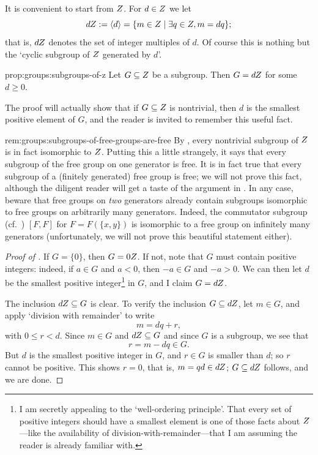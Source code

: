 It is convenient to start from $Z$. For $d \in Z$ we let
\[
  dZ := \langle d \rangle = \{m \in Z \mid \exists q \in Z, m =
  dq\};
\]
that is, $dZ$ denotes the set of integer multiples of $d$. Of course
this is nothing but the `cyclic subgroup of $Z$ generated by $d$'.

\begin{prop}{}{prop:groups:subgroups-of-z}
  Let $G \subseteq Z$ be a subgroup. Then $G = dZ$ for
    some $d \geq 0$.
\end{prop}
The proof will actually show that if $G \subseteq Z$ is nontrivial,
then $d$ is the smallest positive element of $G$, and the reader is
invited to remember this useful fact.

\begin{rem}{}{rem:groups:subgroups-of-free-groups-are-free}
  By , every nontrivial
  subgroup of $Z$ is in fact isomorphic to $Z$. Putting this a
  little strangely, it says that every subgroup of the free group on
  one generator is free. It is in fact true that every subgroup of a
  (finitely generated) free group is free; we will not prove this
  fact, although the diligent reader will get a taste of the argument
  in . In any
  case, beware that free groups on \emph{two} generators already
  contain subgroups isomorphic to free groups on arbitrarily many
  generators. Indeed, the commutator subgroup (cf.\
  ) $[F,F]$ for
  $F = F(\{x,y\})$ is isomorphic to a free group on infinitely many
  generators (unfortunately, we will not prove this beautiful
  statement either).
\end{rem}

\begin{proof}[Proof of ]
  If $G = \{0\}$, then $G = 0Z$. If not, note that $G$ must contain
  positive integers: indeed, if $a \in G$ and $a < 0$, then $-a \in G$
  and $-a > 0$. We can then let $d$ be the smallest positive
  integer\footnote{I am secretly appealing to the `well-ordering
    principle'. That every set of positive integers should have a
    smallest element is one of those facts about $Z$---like the
    availability of division-with-remainder---that I am assuming the
    reader is already familiar with.} in $G$, and I claim $G = dZ$.

  The inclusion $dZ \subseteq G$ is clear. To verify the inclusion
  $G \subseteq dZ$, let $m \in G$, and apply `division with
  remainder' to write
  \[
    m = dq + r,
  \]
  with $0 \leq r < d$. Since $m \in G$ and $dZ \subseteq G$ and since
  $G$ is a subgroup, we see that
  \[
    r = m - dq \in G.
  \]
  But $d$ is the smallest positive integer in $G$, and $r \in G$ is
  smaller than $d$; so $r$ cannot be positive. This shows $r = 0$,
  that is, $m = qd \in dZ$; $G \subseteq dZ$ follows, and we are
  done.
\end{proof}

